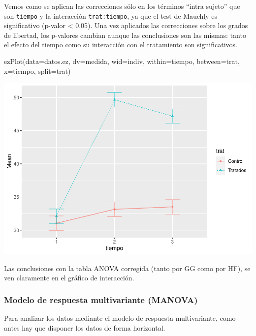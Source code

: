 \documentclass[
]{book}
\newenvironment{Shaded}{\begin{snugshade}}{\end{snugshade}}
\newcommand{\AttributeTok}[1]{\textcolor[rgb]{0.77,0.63,0.00}{#1}}
\newcommand{\FunctionTok}[1]{\textcolor[rgb]{0.00,0.00,0.00}{#1}}
\newcommand{\NormalTok}[1]{#1}
\begin{document}
Vemos como se aplican las correcciones sólo en los términos ``intra sujeto'' que son \texttt{tiempo} y la interacción \texttt{trat:tiempo}, ya que el test de Mauchly es significativo (p-valor \textless{} 0.05).
Una vez aplicados las correcciones sobre los grados de libertad, los p-valores cambian aunque las conclusiones son las mismas: tanto el efecto del tiempo como su interacción con el tratamiento son significativos.

\begin{Shaded}
\begin{Highlighting}[]
\FunctionTok{ezPlot}\NormalTok{(}\AttributeTok{data=}\NormalTok{datos.ez, }
       \AttributeTok{dv=}\NormalTok{medida, }
       \AttributeTok{wid=}\NormalTok{indiv, }
       \AttributeTok{within=}\NormalTok{tiempo, }
       \AttributeTok{between=}\NormalTok{trat,}
       \AttributeTok{x=}\NormalTok{tiempo,}
       \AttributeTok{split=}\NormalTok{trat)}
\end{Highlighting}
\end{Shaded}

\includegraphics{fig_out/unnamed-chunk-60-1.pdf}

Las conclusiones con la tabla ANOVA corregida (tanto por GG como por HF), se ven claramente en el gráfico de interacción.

\hypertarget{modelo-de-respuesta-multivariante-manova-1}{%
\subsubsection{Modelo de respuesta multivariante (MANOVA)}\label{modelo-de-respuesta-multivariante-manova-1}}

Para analizar los datos mediante el modelo de respuesta multivariante, como antes hay que disponer los datos de forma horizontal.
\end{document}
